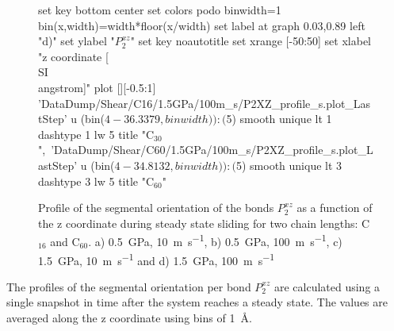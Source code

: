 \documentclass[5p]{elsarticle}
\begin{document}
\begin{figure}[htp]
\begin{center}
\begin{gnuplot}[terminal=epslatex, terminaloptions={size \SERFigwidth cm, \SERFigheight cm color solid}]
		\end{gnuplot}
		\begin{gnuplot}[terminal=epslatex, terminaloptions={size \SERFigwidth cm, \SERFigheight cm color solid}]
		    set key bottom center
			set colors podo
			binwidth=1
			bin(x,width)=width*floor(x/width)
			set label at graph 0.03,0.89 left "d)"
			set ylabel "$P_{2}^{xz}$"
			set key noautotitle
			set xrange [-50:50]
			set xlabel "z coordinate [\\SI{}{\\angstrom}]"  
			plot  	[][-0.5:1]  'DataDump/Shear/C16/1.5GPa/100m_s/P2XZ_profile_s.plot_LastStep'  u (bin($4-36.3379,binwidth)):($5) smooth unique lt 1 dashtype 1  lw 5 title "C$_{30}$",\
			 'DataDump/Shear/C60/1.5GPa/100m_s/P2XZ_profile_s.plot_LastStep'  u (bin($4-34.8132,binwidth)):($5) smooth unique lt 3 dashtype 3  lw 5 title "C$_{60}$"	
		\end{gnuplot}
		\caption{Profile of the segmental orientation of the bonds $P_{2}^{xz}$ as a function of the z coordinate  during steady state sliding for two chain lengths: C$_{16}$ and C$_{60}$. a) \SI{0.5}{\giga\pascal},  \SI{10}{\meter\per\second},   b) \SI{0.5}{\giga\pascal},  \SI{100}{\meter\per\second}, c) \SI{1.5}{\giga\pascal},  \SI{10}{\meter\per\second} and    d) \SI{1.5}{\giga\pascal},  \SI{100}{\meter\per\second}} 
		\label{fig:P2Prof}
	\end{center}
 \end{figure}


The profiles of the segmental orientation per bond $P_{2}^{xz}$ are calculated using a single snapshot in time after the system reaches a steady state. The values are averaged along the z coordinate using bins of \SI{1}{\angstrom}.
\end{document}
